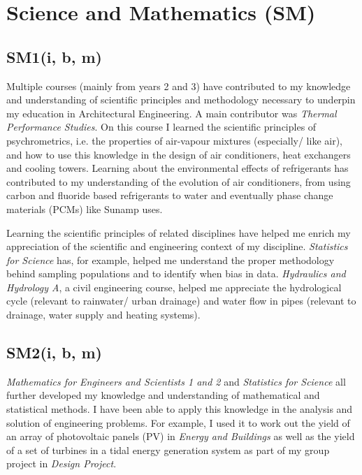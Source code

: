 
\section{Science and Mathematics (SM)}

\subsection*{SM1(i, b, m)}

Multiple courses (mainly from years 2 and 3) have contributed to my knowledge and understanding of scientific principles and methodology necessary to underpin my education in Architectural Engineering.
A main contributor was \textit{Thermal Performance Studies}.
On this course I learned the scientific principles of psychrometrics, i.e. the properties of air-vapour mixtures (especially/ like air), and how to use this knowledge in the design of air conditioners, heat exchangers and cooling towers.
Learning about the environmental effects of refrigerants has contributed to my understanding of the evolution of air conditioners, from using carbon and fluoride based refrigerants to water and eventually phase change materials (PCMs) like Sunamp uses.

Learning the scientific principles of related disciplines have helped me enrich my appreciation of the scientific and engineering context of my discipline.
\textit{Statistics for Science} has, for example, helped me understand the proper methodology behind sampling populations and to identify when bias in data.
\textit{Hydraulics and Hydrology A}, a civil engineering course, helped me appreciate the hydrological cycle (relevant to rainwater/ urban drainage) and water flow in pipes (relevant to drainage, water supply and heating systems).


\subsection*{SM2(i, b, m)}

\textit{Mathematics for Engineers and Scientists 1 and 2} and \textit{Statistics for Science} all further developed my knowledge and understanding of mathematical and statistical methods.
I have been able to apply this knowledge in the analysis and solution of engineering problems.
For example, I used it to work out the yield of an array of photovoltaic panels (PV) in \textit{Energy and Buildings} as well as the yield of a set of turbines in a tidal energy generation system as part of my group project in \textit{Design Project}.


